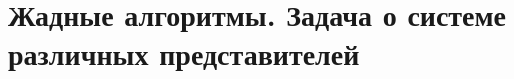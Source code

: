 \documentclass[discrete.tex]{subfiles}
\begin{document}
  \section{Жадные алгоритмы. Задача о системе различных представителей}
\end{document}
